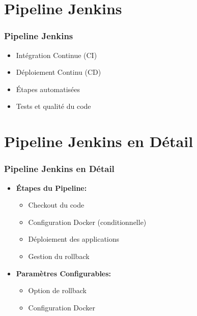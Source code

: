 \documentclass[aspectratio=169]{beamer}
\begin{document}
\section{Pipeline Jenkins}
\begin{frame}
    \frametitle{Pipeline Jenkins}
    \begin{itemize}
        \item Intégration Continue (CI)
        \item Déploiement Continu (CD)
        \item Étapes automatisées
        \item Tests et qualité du code
    \end{itemize}
\end{frame}

\section{Pipeline Jenkins en Détail}
\begin{frame}
    \frametitle{Pipeline Jenkins en Détail}
    \begin{itemize}
        \item \textbf{Étapes du Pipeline:}
        \begin{itemize}
            \item Checkout du code
            \item Configuration Docker (conditionnelle)
            \item Déploiement des applications
            \item Gestion du rollback
        \end{itemize}
        \item \textbf{Paramètres Configurables:}
        \begin{itemize}
            \item Option de rollback
            \item Configuration Docker
        \end{itemize}
    \end{itemize}
\end{frame}
\end{document}
